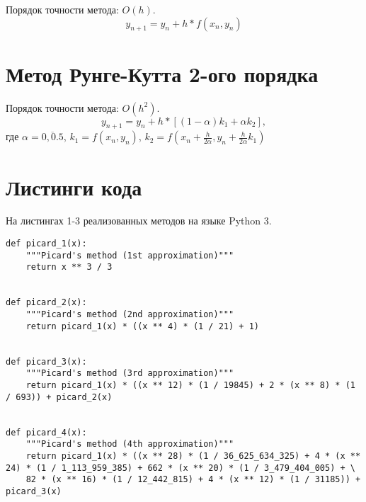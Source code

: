 Порядок точности метода: $O(h)$.
$$y_{n+1} = y_n + h * f(x_n, y_n)$$


\section*{Метод Рунге-Кутта 2-ого порядка}

Порядок точности метода: $O(h^2)$.
$$y_{n+1} = y_n + h * [(1 - \alpha)k_1 + \alpha k_2],$$
где $\alpha = \overline{0, 0.5}$, $k_1 = f(x_n, y_n)$, $k_2 = f(x_n + \frac{h}{2\alpha}, y_n + \frac{h}{2\alpha}k_1)$




\section*{Листинги кода}


На листингах 1-3 реализованных методов на языке Python 3.

\begin{lstlisting}[caption=Методы Пикара]
def picard_1(x):
	"""Picard's method (1st approximation)"""
	return x ** 3 / 3


def picard_2(x):
	"""Picard's method (2nd approximation)"""
	return picard_1(x) * ((x ** 4) * (1 / 21) + 1)


def picard_3(x):
	"""Picard's method (3rd approximation)"""
	return picard_1(x) * ((x ** 12) * (1 / 19845) + 2 * (x ** 8) * (1 / 693)) + picard_2(x)


def picard_4(x):
	"""Picard's method (4th approximation)"""
	return picard_1(x) * ((x ** 28) * (1 / 36_625_634_325) + 4 * (x ** 24) * (1 / 1_113_959_385) + 662 * (x ** 20) * (1 / 3_479_404_005) + \
	82 * (x ** 16) * (1 / 12_442_815) + 4 * (x ** 12) * (1 / 31185)) + picard_3(x)
\end{lstlisting}

